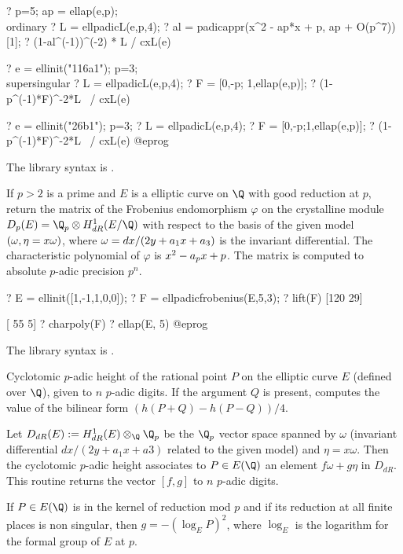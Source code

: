  ? p=5; ap = ellap(e,p); \\ ordinary
 ? L = ellpadicL(e,p,4);
 ? al = padicappr(x^2 - ap*x + p, ap + O(p^7))[1];
 ? (1-al^(-1))^(-2) * L / cxL(e)

 ? e = ellinit("116a1"); p=3; \\ supersingular
 ? L = ellpadicL(e,p,4);
 ? F = [0,-p; 1,ellap(e,p)];
 ? (1-p^(-1)*F)^-2*L~ / cxL(e)

 ? e = ellinit("26b1"); p=3;
 ? L = ellpadicL(e,p,4);
 ? F = [0,-p;1,ellap(e,p)];
 ? (1-p^(-1)*F)^-2*L~ / cxL(e)
 @eprog

The library syntax is .

\label{se:ellpadicfrobenius}
If $p>2$ is a prime and $E$ is a elliptic curve on $\Q$ with good
reduction at $p$, return the matrix of the Frobenius endomorphism $\varphi$ on
the crystalline module $D_p(E)= \Q_p \otimes H^1_{dR}(E/\Q)$ with respect to
the basis of the given model $(\omega, \eta=x\*\omega)$, where
$\omega = dx/(2\*y+a_1\*x+a_3)$ is the invariant differential.
The characteristic polynomial of $\varphi$ is $x^2 - a_p\*x + p$.
The matrix is computed to absolute $p$-adic precision $p^n$.

\bprog
? E = ellinit([1,-1,1,0,0]);
? F = ellpadicfrobenius(E,5,3);
? lift(F)
[120 29]

[ 55  5]
? charpoly(F)
? ellap(E, 5)
@eprog

The library syntax is .

\label{se:ellpadicheight}
Cyclotomic $p$-adic height of the rational point $P$ on the elliptic curve
$E$ (defined over $\Q$), given to $n$ $p$-adic digits.
If the argument $Q$ is present, computes the value of the bilinear
form $(h(P+Q)-h(P-Q)) / 4$.

Let $D_{dR}(E) := H^1_{dR}(E) \otimes_\Q \Q_p$ be the $\Q_p$ vector space
spanned by $\omega$
(invariant differential $dx/(2y+a_1x+a3)$ related to the given model) and
$\eta = x \omega$. Then the cyclotomic $p$-adic height associates to
$P\in E(\Q)$ an element $f \omega + g\eta$ in $D_{dR}$.
This routine returns the vector $[f, g]$ to $n$ $p$-adic digits.

If $P\in E(\Q)$ is in the kernel of reduction mod $p$ and if its reduction
at all finite places is non singular, then $g = -(\log_E P)^2$, where
$\log_E$ is the logarithm for the formal group of $E$ at $p$.

